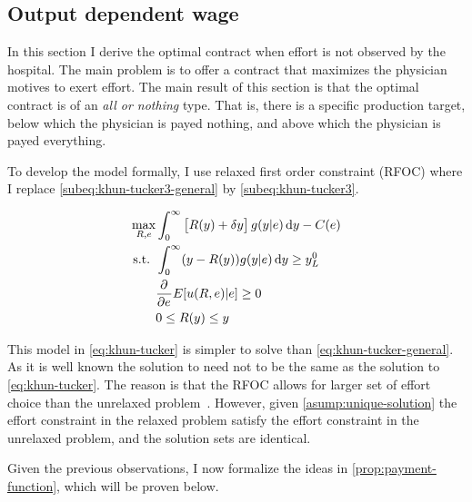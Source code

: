 \subsection{Output dependent wage} %
\label{sub:output_dependent_wage}
In this section I derive the optimal contract when effort is not observed by the hospital. The main problem is to offer a contract that maximizes the physician motives to exert effort. The main result of this section is that the optimal contract is of an \emph{all or nothing} type. That is, there is a specific production target, below which the physician is payed nothing, and above which the physician is payed everything. 

To develop the model formally, I use \textcite{Rogerson1985FirstOrder} relaxed first order constraint (RFOC) where I replace \cref{subeq:khun-tucker3-general} by \cref{subeq:khun-tucker3}. 

\begin{subequations}
\label{eq:khun-tucker}
\begin{align}
    \max_{R,e} & \int_0^{\infty}\left[R(y)+\delta y\right]g(y|e)\dif y-C(e)\label{subeq:khun-tucker1} \\
    \text{s.t. }    & \int_{0}^{\infty} (y-R(y))g(y|e)\dif y\geq y_L^0 \label{subeq:khun-tucker2} \\
                    & \pder{e}E[u(R,e)|e]\geq 0 \label{subeq:khun-tucker3}\\
                    & 0\leq R(y)\leq y \label{subeq:khun-tucker4}
\end{align}
\end{subequations}

This model in \cref{eq:khun-tucker} is simpler to solve than \cref{eq:khun-tucker-general}. As it is well known the solution to need not to be the same as the solution to \cref{eq:khun-tucker}. The reason is that the RFOC allows for larger set of effort choice than the unrelaxed problem~\parencite[see][for a discussion]{Jewitt1988Justifying,Rogerson1985FirstOrder}. However, given \cref{asump:unique-solution} the effort constraint in the relaxed problem satisfy the effort constraint in the  unrelaxed problem, and the solution sets are identical. 

Given the previous observations, I now formalize the ideas in \cref{prop:payment-function}, which will be proven below. 


